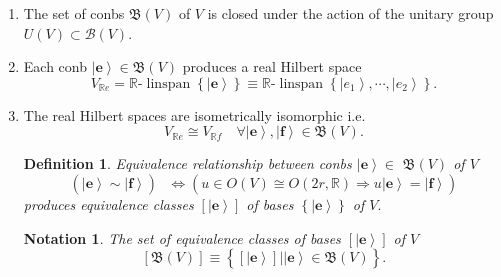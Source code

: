 \documentclass[aps,preprint]{revtex4}%
\newtheorem{definition}[theorem]{Definition}
\newtheorem{notation}[theorem]{Notation}
\begin{document}
\begin{enumerate}
\item The set of conbs $\mathfrak{B}\left(  V\right)  $ of $V$ is closed under
the action of the unitary group $U\left(  V\right)  \subset\mathcal{B}\left(
V\right)  .$

\item Each conb $\left\vert \mathbf{e}\right\rangle \in\mathfrak{B}\left(
V\right)  $ produces a real Hilbert space
\begin{equation}
V_{\mathbb{R}e}=\mathbb{R}\text{-}\operatorname*{linspan}\left\{  \left\vert
\mathbf{e}\right\rangle \right\}  \equiv\mathbb{R}\text{-}%
\operatorname*{linspan}\left\{  \left\vert e_{1}\right\rangle ,\cdots
,\left\vert e_{2}\right\rangle \right\}  .
\end{equation}


\item The real Hilbert spaces are isometrically isomorphic i.e.
\begin{equation}
V_{\mathbb{R}e}\cong V_{\mathbb{R}f}\quad\forall\left\vert \mathbf{e}%
\right\rangle ,\left\vert \mathbf{f}\right\rangle \in\mathfrak{B}\left(
V\right)  .
\end{equation}


\begin{definition}
Equivalence relationship between conbs $\left\vert \mathbf{e}\right\rangle
\in$ $\mathfrak{B}\left(  V\right)  $ of $V$
\begin{equation}
\left(  \overset{}{\left\vert \mathbf{e}\right\rangle \sim\left\vert
\mathbf{f}\right\rangle }\right)  \text{ }\Leftrightarrow\left(
\overset{}{u\in O\left(  V\right)  \cong O\left(  2r,\mathbb{R}\right)
\Rightarrow u\left\vert \mathbf{e}\right\rangle =\left\vert \mathbf{f}%
\right\rangle }\right)
\end{equation}
produces equivalence classes $\left[  \left\vert \mathbf{e}\right\rangle
\right]  $ of bases $\left\{  \left\vert \mathbf{e}\right\rangle \right\}  $
of $V.$
\end{definition}

\begin{notation}
The set of equivalence classes of bases $\left[  \left\vert \mathbf{e}%
\right\rangle \right]  $ of $V$
\begin{equation}
\left[  \mathfrak{B}\left(  V\right)  \right]  \equiv\left\{
\overset{}{\left.  \left[  \left\vert \mathbf{e}\right\rangle \right]
\right\vert \left\vert \mathbf{e}\right\rangle \in\mathfrak{B}\left(
V\right)  }\right\}  .
\end{equation}


\end{notation}
\end{enumerate}
\end{document}
